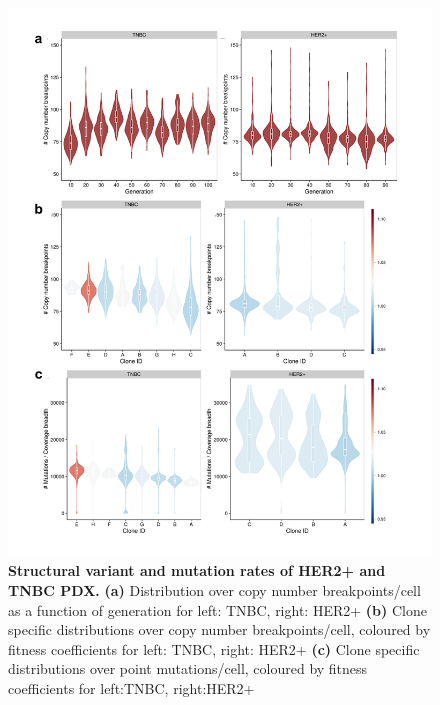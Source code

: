 \begin{figure}
\centering
\includegraphics[width=\textwidth]{Figures/chap4/mutationanalysisbreakpoints.pdf}
  \caption[Structural variant and mutation rates of HER2+ and TNBC PDX]
	{\small
	\textbf{Structural variant and mutation rates of HER2+ and TNBC PDX.}
	    \textbf{(a)} Distribution over copy number
breakpoints/cell as a function of generation for left: TNBC, right: HER2+
   \textbf{(b)} Clone specific distributions over copy number breakpoints/cell, coloured by fitness coefficients for left: TNBC, right: HER2+
    \textbf{(c)} Clone specific distributions over point mutations/cell, coloured by fitness coefficients for left:TNBC, right:HER2+
}
    \label{fig:mutationanalysisbreakpoints}
    \end{figure}


